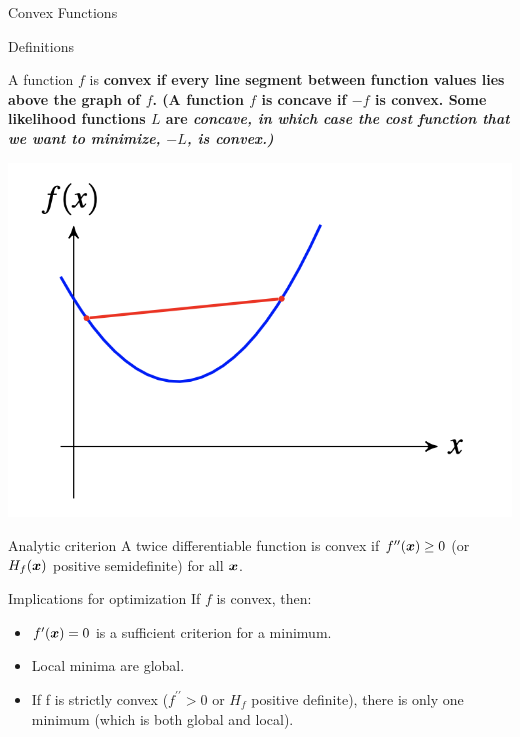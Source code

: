 \documentclass[10pt]{beamer}
\begin{document}
\begin{frame}{Convex Functions}

\begin{sblock}{Definitions}

\begin{minipage}{.6\textwidth}
A function $f$ is \bf{convex} if every line segment between function values lies above the graph of $f$.  \tiny{(A function $f$ is \bf{concave} if $-f$ is convex.  Some likelihood functions $L$ are \it{concave}, in which case the \it{cost function} that we want to minimize, $-L$, is convex.)}
\end{minipage}
\hfill
\begin{minipage}{.3\textwidth}
\includegraphics[width=\textwidth]{images/convexity}
\end{minipage}
\end{sblock}

\begin{sblock}{Analytic criterion}
 A twice differentiable function is convex if $f^{\prime \prime}({\boldsymbol x}) \geq 0$ (or $H_f ({\boldsymbol x})$ positive semidefinite) for all ${\boldsymbol x}$.
\end{sblock}  
  
\begin{sblock}{Implications for optimization}
If $f$ is convex, then:
\begin{itemize}
\item $f^\prime ({\boldsymbol x}) = 0$ is a sufficient criterion for a minimum. 
\item Local minima are global.
\item If f is strictly convex ($f^{\prime \prime} > 0$ or $H_f$ positive definite), there is only one minimum (which is both global and local).
\end{itemize}
\end{sblock}

\end{frame}
\end{document}

